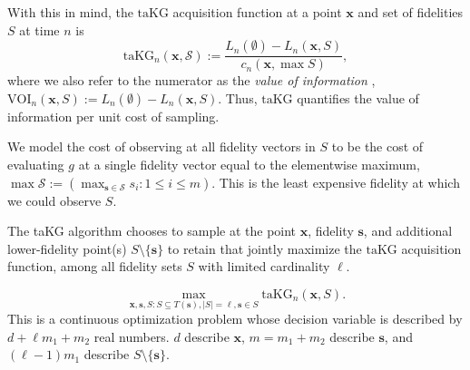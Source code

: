 \documentclass[letterpaper]{article}
\newcommand{\cost}{c}
\newcommand{\x}{\mathbf{x}}
\newcommand{\s}{\mathbf{s}}
\newcommand{\T}{T}
\renewcommand{\S}{S}
\newcommand{\loss}{L}
\newcommand{\taKG}{\text{taKG}}
\numberwithin{equation}{section}
\newcommand{\xxcomment}[4]{\textcolor{#1}{[$^{\textsc{#2}}_{\textsc{#3}}$ #4]}}
\newcommand{\pf}[1]{\xxcomment{blue}{P}{F}{#1}}
\begin{document}
With this in mind, the $\taKG$ acquisition function at a point $\x$ and set of fidelities $\S$ at time $n$ is
\begin{equation*}
\taKG_n(\x, \mathcal{S}) := \frac{\loss_n(\emptyset) - \loss_n(\x,\S)}{\cost_n(\x, \max \S)},
\end{equation*}
where we also refer to the numerator as the {\it value of information} \citep{Ho66},
$\text{VOI}_n(\x,\S) := \loss_n(\emptyset) - \loss_n(\x,\S)$.
Thus, $\taKG$ quantifies the value of information per unit cost of sampling.

We model the cost of observing at all fidelity vectors in $\S$ to be the cost of evaluating $g$ at a single fidelity vector equal to the elementwise maximum, $\max \mathcal{S} := (\max_{\s \in \mathcal{S}} s_i: 1 \le i \le m)$.  
This is the least expensive fidelity at which we could observe $\S$. 


The taKG algorithm chooses to sample at the point $\x$, fidelity $\s$, and additional lower-fidelity point(s) $\S \setminus \{\s\}$ to retain that jointly maximize the $\taKG$ acquisition function, among all fidelity sets $\S$ with limited cardinality $\ell$.

\begin{equation}
\max_{\x,\s,\S:\S\subseteq \T\left(\s\right),\left|\S\right|=\ell,\s\in\S} \taKG_n \left(\x, \S \right).
\label{eqn:max-taKG}
\end{equation}
This is a continuous optimization problem whose decision variable is described by $d + \ell m_1 + m_2$ real numbers. $d$ describe $\x$, $m=m_1+m_2$ describe $\s$, and $(\ell-1)m_1$ describe $\S \setminus \{\s\}$.

\end{document}
